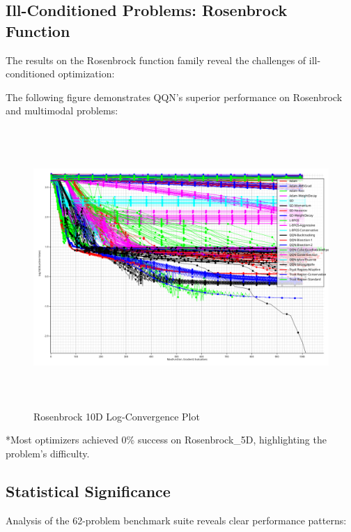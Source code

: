 \hypertarget{ill-conditioned-problems-rosenbrock-function}{%
\subsection{Ill-Conditioned Problems: Rosenbrock Function}\label{ill-conditioned-problems-rosenbrock-function}}

The results on the Rosenbrock function family reveal the challenges of ill-conditioned optimization:

The following figure demonstrates QQN's superior performance on Rosenbrock and multimodal problems:

\begin{figure}
\centering
\includegraphics[width=6.25in,height=4.16667in]{../results/full_all_optimizers_20250728_133324/convergence_Rosenbrock_10D_log.png}
\caption{Rosenbrock 10D Log-Convergence Plot}
\end{figure}



*Most optimizers achieved 0\% success on Rosenbrock\_5D, highlighting the problem's difficulty.

\hypertarget{statistical-significance}{%
\subsection{Statistical Significance}\label{statistical-significance}}

Analysis of the 62-problem benchmark suite reveals clear performance patterns:

